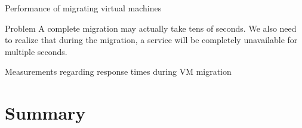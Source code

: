   \begin{slide}{Performance of migrating virtual machines}
    \begin{block}{Problem}
      A complete migration may actually take tens of seconds. We also need to realize that during the
      migration, a service will be completely unavailable for multiple seconds. 
    \end{block}
    \begin{block}{Measurements regarding response times during VM migration}
      \begin{center}
      \end{center}
    \end{block}
  \end{slide}
\section{Summary}
